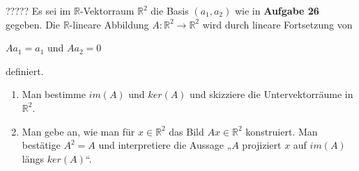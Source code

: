 \documentclass{uebblatt}
\begin{document}
\begin{aufgabe}{?????}
Es sei im $\mathbb{R}$-Vektorraum $\mathbb{R}^2$ die Basis $(a_1, a_2)$ wie in \textbf{Aufgabe 26} gegeben. Die $\mathbb{R}$-lineare Abbildung $A: \mathbb{R}^2 \to \mathbb{R}^2$ wird durch lineare Fortsetzung von
\begin{center}
$Aa_1 = a_1$ und $Aa_2 = 0$
\end{center}
definiert.
\begin{enumerate}
\item Man bestimme $im(A)$ und $ker(A)$ und skizziere die Untervektorräume in $\mathbb{R}^2$.
\item Man gebe an, wie man für $x \in \mathbb{R}^2$ das Bild $Ax \in \mathbb{R}^2$ konstruiert. Man bestätige $A^2 = A$ und interpretiere die Aussage „$A$ projiziert $x$ auf $im(A)$ längs $ker(A)$“.
\end{enumerate}
\end{aufgabe}
\end{document}
